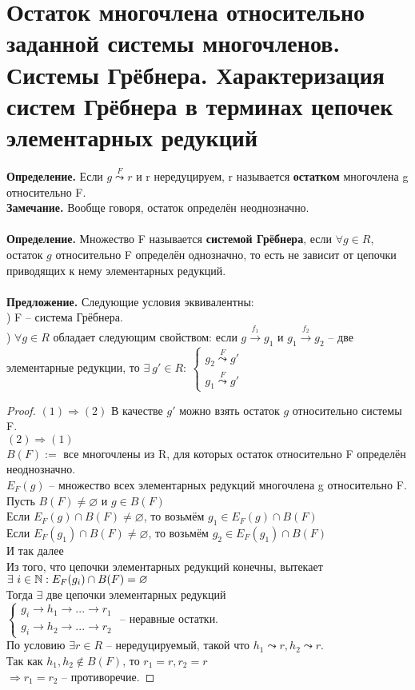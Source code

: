 \section{Остаток многочлена относительно заданной системы многочленов. Системы Грёбнера. Характеризация систем Грёбнера в терминах цепочек элементарных редукций}

\textbf{Определение.} Если $g\overset{F}{\leadsto}r$ и r нередуцируем, r называется \textbf{остатком} многочлена g относительно F.\\
\textbf{Замечание.} Вообще говоря, остаток определён неоднозначно.\\\\
\textbf{Определение.} Множество F называется \textbf{системой Грёбнера}, если $\forall g \in R$, остаток $g$ относительно F определён однозначно, то есть не зависит от цепочки приводящих к нему элементарных редукций.\\\\
\textbf{Предложение.} Следующие условия эквивалентны:\\
) F -- система Грёбнера.\\
) $\forall g\in R$ обладает следующим свойством: если $g\overset{f_1}{\to}g_1$ и $g_1\overset{f_2}{\to}g_2$ -- две элементарные редукции, то $\exists \ g'\in R:\ \begin{cases} g_2\overset{F}{\leadsto}g'\\g_1\overset{F}{\leadsto}g' \end{cases}$
\begin{proof}
    $(1)\Rightarrow (2)$ В качестве $g'$ можно взять остаток $g$ относительно системы F.\\
    $(2)\Rightarrow (1)$\\ $B(F):=$ все многочлены из R, для которых остаток относительно F определён неоднозначно.\\
    $E_F(g)$ -- множество всех элементарных редукций многочлена g относительно F.\\
    Пусть $B(F)\neq \varnothing$ и $g\in B(F)$\\
    Если $E_F(g)\cap B(F)\neq\varnothing$, то возьмём $g_1\in E_F(g)\cap B(F)$\\
    Если $E_F(g_1)\cap B(F)\neq\varnothing$, то возьмём $g_2\in E_F(g_1)\cap B(F)$\\
    И так далее\\
    Из того, что цепочки элементарных редукций конечны, вытекает $\exists \ i\in \mathbb{N}: E_F(g_i)\cap B(F)=\varnothing$\\
    Тогда $\exists $ две цепочки элементарных редукций\\
    $\begin{cases} g_i\to h_1\to ...\to r_1\\g_i\to h_2\to ...\to r_2 \end{cases}$ -- неравные остатки.\\
    По условию $\exists r\in R$ -- нередуцируемый, такой что $h_1\leadsto r, h_2\leadsto r$.\\
    Так как $h_1, h_2\not\in B(F)$, то $r_1=r, r_2=r$\\
    $\Rightarrow r_1=r_2$ -- противоречие.
\end{proof}